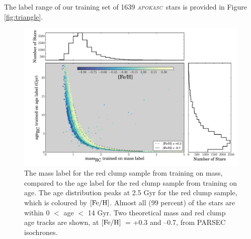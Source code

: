 \documentclass[12pt, preprint]{aastex}
\newcommand{\project}[1]{\textsl{#1}}
\newcommand{\apogee}{\project{\textsc{apogee}}}
\newcommand{\apokasc}{\project{\textsc{apokasc}}}
\newcommand{\feh}{\mbox{$\rm [Fe/H]$}}
\begin{document}
%


The label range of our training set of 1639 \apokasc\ stars is provided in Figure \ref{fig:triangle}. 


\begin{figure}[h]
\centering
        \includegraphics[scale=0.4]{./plots/massage_hist2.pdf}
  \caption{The mass label for the red clump sample from training on mass, compared to the age label for the red clump sample from training on age. The age distribution peaks at 2.5 Gyr for the red clump sample, which is coloured by \feh. Almost all (99 percent) of the stars are within 0 $<$ age $<$ 14 Gyr. Two theoretical mass and red clump age tracks are shown, at \feh\ = +0.3 and --0.7, from PARSEC isochrones. }
\label{fig:agemass}
\end{figure}
\end{document}

